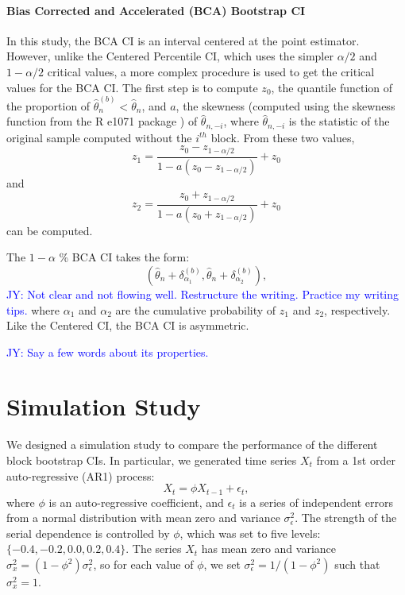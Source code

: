 \documentclass[12pt, letterpaper, titlepage]{article}
\newcommand{\jy}[1]{\textcolor{blue}{JY: #1}}
\begin{document}
\paragraph{Bias Corrected and Accelerated (BCA) Bootstrap CI}
In this study, the BCA CI is an interval centered at the point estimator.
However, unlike the Centered Percentile CI, which uses the simpler $\alpha/2$
and $1 - \alpha/2$ critical values, a more complex procedure is used to get
the critical values for the BCA CI. The first step is to compute $z_0$, the
quantile function of the proportion of 
$\hat\theta_n^{(b)} < \hat\theta_n$, and $a$, the skewness (computed
using
the skewness function from the R e1071 package \citep{e1071}) of
$\hat{\theta}_{n, -i}$, where $\hat{\theta}_{n, -i}$ is the statistic of the
original sample computed without the $i^{th}$ block. From these two values,
\[z_{1} = \frac{z_{0} - z_{1 - \alpha/2}}{1 - a(z_{0} - z_{1 - \alpha/2})} +
z_{0}\] and
\[z_{2} = \frac{z_{0} + z_{1 - \alpha/2}}{1 - a(z_{0} + z_{1 - \alpha/2})} +
z_{0}\] can be computed. 

The $1 - \alpha$ \% BCA CI takes the form:
\[
(\hat{\theta}_{n} + \delta^{(b)}_{\alpha_1},
\hat{\theta}_{n} + \delta^{(b)}_{\alpha_2}),
\]
\jy{Not clear and not flowing well. Restructure the writing. Practice my
  writing tips.}
where $\alpha_{1}$ and $\alpha_{2}$ are the cumulative probability of $z_{1}$
and
$z_{2}$, respectively.
Like the Centered CI, the BCA CI is asymmetric. 

\jy{Say a few words about its properties.}


\section{Simulation Study}
\label{sec:simstudy}

We designed a simulation study to compare the performance of the different
block
bootstrap CIs. In particular, we generated time series $X_t$
from a 1st order auto-regressive (AR1) process:
\[
X_t = \phi X_{t-1} + \epsilon_t,
\]
where $\phi$ is an auto-regressive coefficient, and $\epsilon_t$ is a series of
independent errors from a normal distribution with mean zero and variance
$\sigma_{\epsilon}^2$. The strength of the serial dependence is controlled by
$\phi$, which was set to five levels: $\{-0.4, -0.2, 0.0, 0.2, 0.4\}$.
The series $X_t$ has mean zero and variance
$\sigma_x^2 = (1 - \phi^2) \sigma_{\epsilon}^2$, so for each value of $\phi$,
we
set $\sigma_{\epsilon}^2 = 1 / (1 - \phi^2)$ such that $\sigma_x^2 = 1$.
\end{document}
